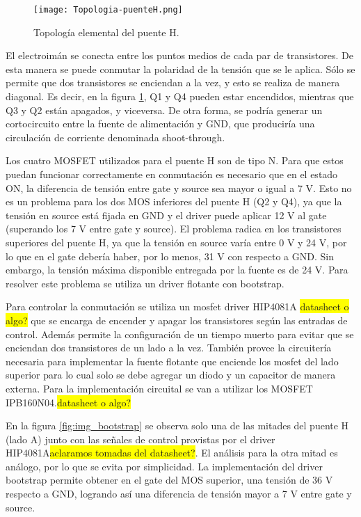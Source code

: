 \begin{figure}[H]
	\centering
	\texttt{[image: Topologia-puenteH.png]}
	\caption{Topología elemental del puente H.}
	\label{fig:img_topologia-puenteH}
\end{figure}

\noindent El electroimán se conecta entre los puntos medios de cada par de transistores. De esta manera se puede conmutar la polaridad de la tensión que se le aplica. Sólo se permite que dos transistores se enciendan a la vez, y esto se realiza de manera diagonal. Es decir, en la figura \ref{fig:img_topologia-puenteH}, Q1 y Q4 pueden estar encendidos, mientras que Q3 y Q2 están apagados, y viceversa. De otra forma, se podría generar un cortocircuito entre la fuente de alimentación y GND, que produciría una circulación de corriente denominada shoot-through. 


\noindent Los cuatro MOSFET utilizados para el puente H son de tipo N. Para que estos puedan funcionar correctamente en conmutación es necesario que en el estado ON, la diferencia de tensión entre gate y source sea mayor o igual a 7 V. Esto no es un problema para los dos MOS inferiores del puente H (Q2 y Q4), ya que la tensión en source está fijada en GND y el driver puede aplicar 12 V al gate (superando los 7 V entre gate y source). El problema radica en los transistores superiores del puente H, ya que la tensión en source varía entre 0 V y 24 V, por lo que en el gate debería haber, por lo menos, 31 V con respecto a GND. Sin embargo, la tensión máxima disponible entregada por la fuente es de 24 V. Para resolver este problema se utiliza un driver flotante con bootstrap.

\noindent Para controlar la conmutación se utiliza un mosfet driver HIP4081A \colorbox{yellow}{datasheet o algo?} que se encarga de encender y apagar los transistores según las entradas de control. Además permite la configuración de un tiempo muerto para evitar que se enciendan dos transistores de un lado a la vez. También provee la circuitería necesaria para implementar la fuente flotante que enciende los mosfet del lado superior para lo cual solo se debe agregar un diodo y un capacitor de manera externa. Para la implementación circuital se van a utilizar los MOSFET IPB160N04.\colorbox{yellow}{datasheet o algo?}

\noindent En la figura \ref{fig:img_bootstrap} se observa solo una de las mitades del puente H (lado A)  junto con las señales de control provistas por el driver HIP4081A\colorbox{yellow}{aclaramos tomadas del datasheet?}. El análisis para la otra mitad es análogo, por lo que se evita por simplicidad. La implementación del driver bootstrap permite obtener en el gate del MOS superior, una tensión de 36 V respecto a GND, logrando así una diferencia de tensión mayor a 7 V entre gate y source. 


